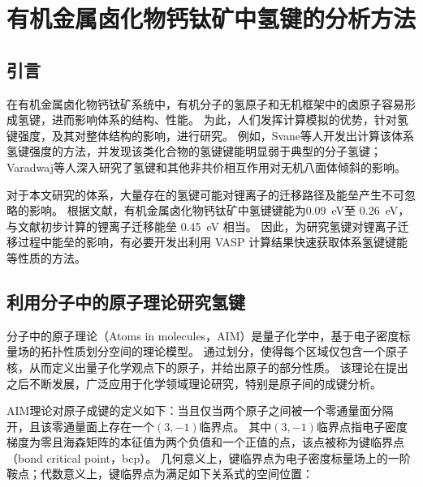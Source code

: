 \chapter{有机金属卤化物钙钛矿中氢键的分析方法}
\label{ch:bcp}

\section{引言}

在有机金属卤化物钙钛矿系统中，有机分子的氢原子和无机框架中的卤原子容易形成氢键，进而影响体系的结构、性能。
为此，人们发挥计算模拟的优势，针对氢键强度，及其对整体结构的影响，进行研究。
例如，Svane等人开发出计算该体系氢键强度的方法，并发现该类化合物的氢键键能明显弱于典型的分子氢键；
Varadwaj等人深入研究了氢键和其他非共价相互作用对无机八面体倾斜的影响。

对于本文研究的体系，大量存在的氢键可能对锂离子的迁移路径及能垒产生不可忽略的影响。
根据文献\cite{svaneHowStrongHydrogen2017}，有机金属卤化物钙钛矿中氢键键能为\SI{0.09}{eV}至 \SI{0.26}{eV}，与文献\cite{yinMetalChloridePerovskite2020}初步计算的锂离子迁移能垒 \SI{0.45}{eV} 相当。
因此，为研究氢键对锂离子迁移过程中能垒的影响，有必要开发出利用 VASP 计算结果快速获取体系氢键键能等性质的方法。

\section{利用分子中的原子理论研究氢键}

分子中的原子理论（Atoms in molecules，AIM）是量子化学中，基于电子密度标量场的拓扑性质划分空间的理论模型。
通过划分，使得每个区域仅包含一个原子核，从而定义出量子化学观点下的原子，并给出原子的部分性质。
该理论在提出之后不断发展，广泛应用于化学领域理论研究，特别是原子间的成键分析。

AIM理论对原子成键的定义如下：当且仅当两个原子之间被一个零通量面分隔开，且该零通量面上存在一个$(3,-1)$临界点。
其中$(3,-1)$临界点指电子密度梯度为零且海森矩阵的本征值为两个负值和一个正值的点，该点被称为键临界点（bond critical point，bcp）。
几何意义上，键临界点为电子密度标量场上的一阶鞍点；代数意义上，键临界点为满足如下关系式的空间位置：

